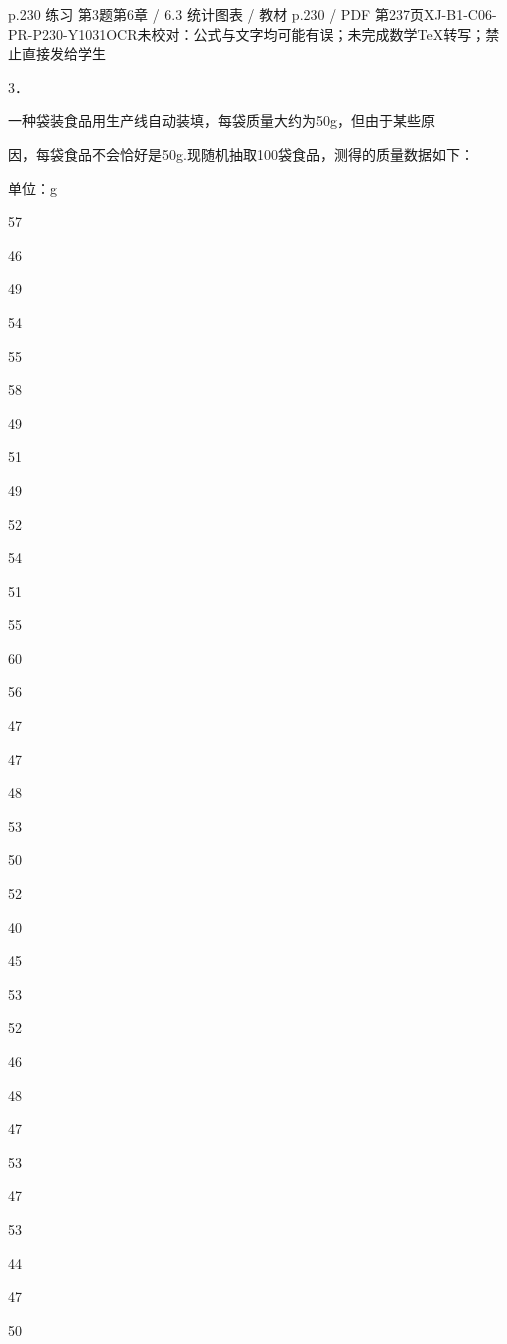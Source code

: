 \begin{bankitem}{p.230 练习 第3题}{第6章 / 6.3 统计图表 / 教材 p.230 / PDF 第237页}{XJ-B1-C06-PR-P230-Y1031}{OCR未校对：公式与文字均可能有误；未完成数学TeX转写；禁止直接发给学生}
\begin{ocrdraft}
\par
3．
\par
一种袋装食品用生产线自动装填，每袋质量大约为50g，但由于某些原
\par
因，每袋食品不会恰好是50g.现随机抽取100袋食品，测得的质量数据如下：
\par
单位：g
\par
57
\par
46
\par
49
\par
54
\par
55
\par
58
\par
49
\par
51
\par
49
\par
52
\par
54
\par
51
\par
55
\par
60
\par
56
\par
47
\par
47
\par
48
\par
53
\par
50
\par
52
\par
40
\par
45
\par
53
\par
52
\par
46
\par
48
\par
47
\par
53
\par
47
\par
53
\par
44
\par
47
\par
50
\par

\end{ocrdraft}
\end{bankitem}
